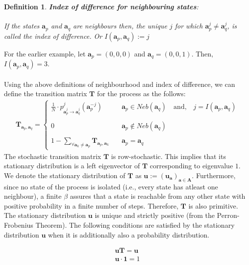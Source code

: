 \documentclass[11pt]{article}
\theoremstyle{plainCl1}
\newtheorem{definition}{Definition}
\theoremstyle{plainCl2}
\newcommand{\A}{\mathbf{A}}
\newcommand{\abf}{\mathbf{a}}
\newcommand{\T}{\mathbf{T}}
\newcommand{\ubf}{\mathbf{u}}
\begin{document}
\begin{definition}
\textbf{Index of difference for neighbouring states}: \\ \\ If the states $\abf_p$ and $\abf_q$ are neighbours then, the unique $j$ for which $\abf_p^{j} \neq \abf_q^{j}$, is called the index of difference. Or $I(\abf_p,\abf_q) := j$
\label{Def:index-of-difference}
\end{definition}
\noindent For the earlier example, let $\abf_p = (\mathit{0}, \mathit{0}, \mathit{0})$ and $\abf_q = (\mathit{0}, \mathit{0}, \mathit{1})$. Then, $I(\abf_p,\abf_q) = 3$. 
\\ \\ 
Using the above definitions of neighbourhood and index of difference, we can define the transition matrix $\T$ for the process as the follows: 
\begin{align}
\T_{\abf_p,\abf_q} = 
\begin{cases}
\frac{1}{N}  \cdot p^j_{\abf^j_p \to \abf^j_q} (\abf_p^{-j}) \quad  \quad &\abf_p \in \mathit{Neb}(\abf_q) \quad \text{and,} \quad j = I(\abf_p,\abf_q)\\ \\ 
0 \quad & \abf_{p} \notin \mathit{Neb}(\abf_q) \\ \\
1 - \sum_{\forall \abf_k \neq \abf_p} \T_{\abf_p,\abf_k} \quad &\abf_p = \abf_q
\end{cases}
\label{Eq:transition-matrix}
\end{align}
\noindent The stochastic transition matrix $\T$ is row-stochastic. This implies that its stationary distribution is a left eigenvector of $\T$ corresponding to eigenvalue $1$. We denote the stationary distribution of $\T$ as $\ubf := (\ubf_{\abf})_{\abf \in \A}$. Furthermore, since no state of the process is isolated (i.e., every state has atleast one neighbour), a finite $\beta$ assures that a state is reachable from any other state with positive probability in a finite number of steps. Therefore, $\T$ is also primitive. The stationary distribution $\ubf$ is unique and strictly positive (from the Perron-Frobenius Theorem). The following conditions are satisfied by the stationary distribution $\ubf$ when it is additionally also a probability distribution. 

\begin{eqnarray}
\label{Eq:lefteigenvector}
\ubf \T = \ubf \\ 
\label{Eq:normalizationcondition}
\ubf \cdot \mathbf{1} = 1
\end{eqnarray}
\end{document}
